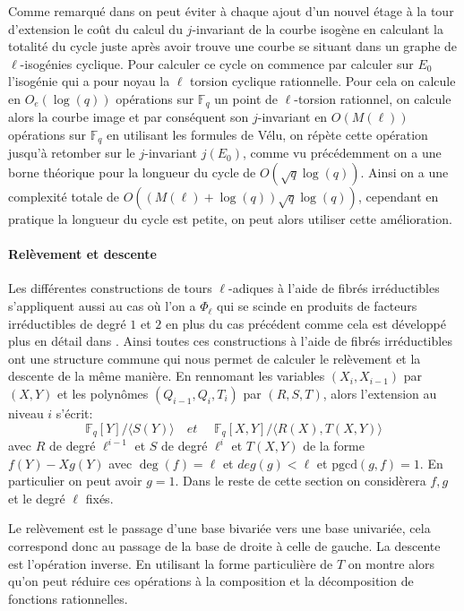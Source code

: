 \documentclass[10pt,a4paper]{book}
\theoremstyle{plain}
\theoremstyle{definition}
\theoremstyle{definition}
\theoremstyle{definition}
\theoremstyle{definition}
\theoremstyle{remark}
\theoremstyle{remark}
\begin{document}
Comme remarqué dans \cite{DeFeo-Doliskani-Schost13} on peut éviter à chaque ajout d'un nouvel étage à la tour d'extension le coût du calcul du $j$-invariant de la courbe isogène en calculant la totalité du cycle juste après avoir trouve une courbe se situant dans un graphe de $\ell$-isogénies cyclique. Pour calculer ce cycle on commence par calculer sur $E_0$ l'isogénie qui a pour noyau la $\ell$ torsion cyclique rationnelle. Pour cela on calcule en $O_e(\log(q))$ opérations sur $\mathbb{F}_q$ un point de $\ell$-torsion rationnel, on calcule alors la courbe image et par conséquent son $j$-invariant en $O(M(\ell))$ opérations sur $\mathbb{F}_q$ en utilisant les formules de Vélu, on répète cette opération jusqu'à retomber sur le $j$-invariant $j(E_0)$, comme vu précédemment on a une borne théorique pour la longueur du cycle de $O(\sqrt{q}\log(q))$. Ainsi on a une complexité totale de $O((M(\ell) + \log(q)) \sqrt{q} \log(q))$, cependant en pratique la longueur du cycle est petite, on peut alors utiliser cette amélioration.


\paragraph{Relèvement et descente}
Les différentes constructions de tours $\ell$-adiques à l'aide de fibrés irréductibles s'appliquent aussi au cas où l'on a $\Phi_{\ell}$ qui se scinde en produits de facteurs irréductibles de degré $1$ et $2$ en plus du cas précédent comme cela est développé plus en détail dans \cite{DeFeo-Doliskani-Schost13}. Ainsi toutes ces constructions à l'aide de fibrés irréductibles ont une structure commune qui nous permet de calculer le relèvement et la descente de la même manière. En rennomant les variables $(X_i,X_{i-1})$ par $(X,Y)$ et les polynômes $(Q_{i-1},Q_{i},T_i)$ par $(R,S,T)$, alors l'extension au niveau $i$ s'écrit:
\begin{equation}
\mathbb{F}_q[Y]/\langle S(Y) \rangle  \quad \textit{et } \quad \mathbb{F}_q[X,Y]/ \langle R(X), T(X,Y) \rangle
\end{equation}
avec $R$ de degré $\ell^{i-1}$ et $S$ de degré $\ell^i$ et $T(X,Y)$ de la forme $f(Y) -Xg(Y)$ avec $\deg(f)=\ell$ et $deg(g)< \ell$ et $ \mathrm{pgcd}(g,f)=1$. En particulier on peut avoir $g=1$. Dans le reste de cette section on considèrera $f,g$ et le degré $\ell$ fixés.

Le relèvement est le passage d'une base bivariée vers une base univariée, cela correspond donc au passage de la base de droite à celle de gauche. La descente est l'opération inverse. En utilisant la forme particulière de $T$ on montre alors qu'on peut réduire ces opérations à la composition et la décomposition de fonctions rationnelles.
\end{document}
